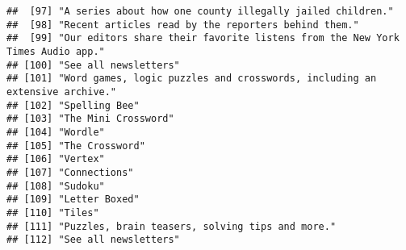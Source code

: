 \documentclass[
]{article}
\begin{document}
\begin{verbatim}
##  [97] "A series about how one county illegally jailed children."                                                                                                 
##  [98] "Recent articles read by the reporters behind them."                                                                                                       
##  [99] "Our editors share their favorite listens from the New York Times Audio app."                                                                              
## [100] "See all newsletters"                                                                                                                                      
## [101] "Word games, logic puzzles and crosswords, including an extensive archive."                                                                                
## [102] "Spelling Bee"                                                                                                                                             
## [103] "The Mini Crossword"                                                                                                                                       
## [104] "Wordle"                                                                                                                                                   
## [105] "The Crossword"                                                                                                                                            
## [106] "Vertex"                                                                                                                                                   
## [107] "Connections"                                                                                                                                              
## [108] "Sudoku"                                                                                                                                                   
## [109] "Letter Boxed"                                                                                                                                             
## [110] "Tiles"                                                                                                                                                    
## [111] "Puzzles, brain teasers, solving tips and more."                                                                                                           
## [112] "See all newsletters"                                                                                                                                      

\end{verbatim}
\end{document}
